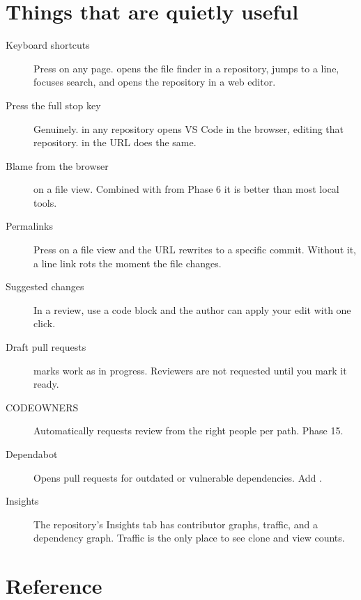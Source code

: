 \documentclass[11pt]{article}
\begin{document}
\section{Things that are quietly useful}

\begin{description}
  \item[Keyboard shortcuts] Press  on any page.  opens the file finder in
    a repository,  jumps to a line,  focuses search, and  opens the
    repository in a web editor.
  \item[Press the full stop key] Genuinely.  in any repository opens VS Code in
    the browser, editing that repository.  in the URL does the same.
  \item[Blame from the browser]  on a file view. Combined with
     from Phase 6 it is better than most local tools.
  \item[Permalinks] Press  on a file view and the URL rewrites to a specific
    commit. Without it, a line link rots the moment the file changes.
  \item[Suggested changes] In a review, use a  code block and the
    author can apply your edit with one click.
  \item[Draft pull requests]  marks work as in progress.
    Reviewers are not requested until you mark it ready.
  \item[CODEOWNERS] Automatically requests review from the right people per path.
    Phase 15.
  \item[Dependabot] Opens pull requests for outdated or vulnerable dependencies. Add
    .
  \item[Insights] The repository's Insights tab has contributor graphs, traffic, and
    a dependency graph. Traffic is the only place to see clone and view counts.
\end{description}

\section{Reference}
\end{document}
